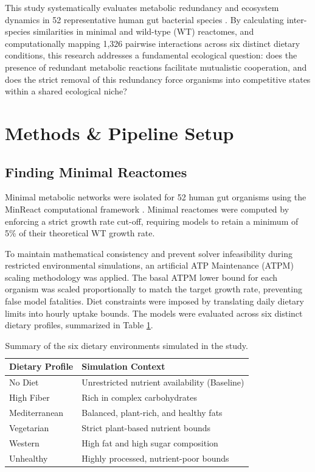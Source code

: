\documentclass[11pt, a4paper]{article}
\begin{document}
This study systematically evaluates metabolic redundancy and ecosystem dynamics in 52 representative human gut bacterial species \cite{3}. By calculating inter-species similarities in minimal and wild-type (WT) reactomes, and computationally mapping 1,326 pairwise interactions across six distinct dietary conditions, this research addresses a fundamental ecological question: does the presence of redundant metabolic reactions facilitate mutualistic cooperation, and does the strict removal of this redundancy force organisms into competitive states within a shared ecological niche?

\section{Methods \& Pipeline Setup}

\subsection{Finding Minimal Reactomes}
Minimal metabolic networks were isolated for 52 human gut organisms using the MinReact computational framework \cite{1}. Minimal reactomes were computed by enforcing a strict growth rate cut-off, requiring models to retain a minimum of 5\% of their theoretical WT growth rate. 

To maintain mathematical consistency and prevent solver infeasibility during restricted environmental simulations, an artificial ATP Maintenance (ATPM) scaling methodology was applied. The basal ATPM lower bound for each organism was scaled proportionally to match the target growth rate, preventing false model fatalities. Diet constraints were imposed by translating daily dietary limits into hourly uptake bounds. The models were evaluated across six distinct dietary profiles, summarized in Table \ref{tab:diets}.

\begin{table}[htbp]
    \centering
    \renewcommand{\arraystretch}{1.2}
    \begin{tabular}{|l|l|}
        \hline
        \textbf{Dietary Profile} & \textbf{Simulation Context} \\
        \hline
        No Diet & Unrestricted nutrient availability (Baseline) \\ \hline
        High Fiber & Rich in complex carbohydrates \\ \hline
        Mediterranean & Balanced, plant-rich, and healthy fats \\ \hline
        Vegetarian & Strict plant-based nutrient bounds \\ \hline
        Western & High fat and high sugar composition \\ \hline
        Unhealthy & Highly processed, nutrient-poor bounds \\ \hline
    \end{tabular}
    \vspace{0.2cm}
    \caption{Summary of the six dietary environments simulated in the study.}
    \label{tab:diets}
\end{table}
\end{document}

